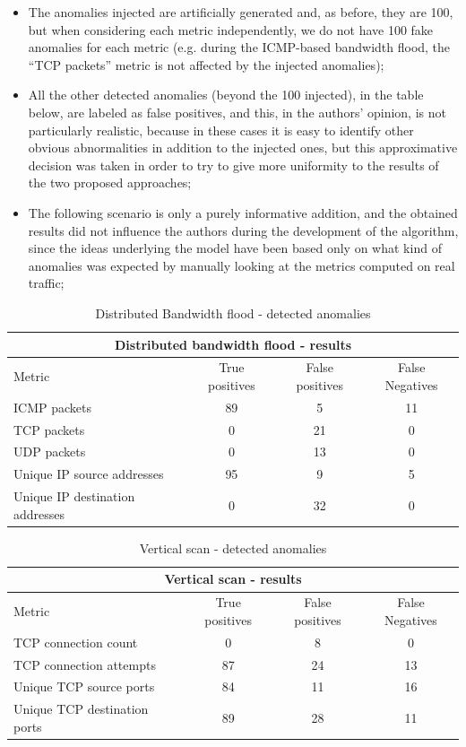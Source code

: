 \documentclass[12pt,a4paper,cucitura]{toptesi}
\begin{document}
\begin{itemize}
\item The anomalies injected are artificially generated and, as before, they are 100, but when considering each metric independently, we do not have 100 fake anomalies for each metric (e.g. during the ICMP-based bandwidth flood, the ``TCP packets'' metric is not affected by the injected anomalies);
\item All the other detected anomalies (beyond the 100 injected), in the table below, are labeled as false positives, and this, in the authors' opinion, is not particularly realistic, because in these cases it is easy to identify other obvious abnormalities in addition to the injected ones, but this approximative decision was taken in order to try to give more uniformity to the results of the two proposed approaches;
\item The following scenario is only a purely informative addition, and the obtained results did not influence the authors during the development of the algorithm, since the ideas underlying the model have been based only on what kind of anomalies was expected by manually looking at the metrics computed on real traffic;
\end{itemize}

\begin{center}
\begin{table}
\begin{tabular}{l|c|c|c}
\hline
\hline
\multicolumn{4}{c}{Distributed bandwidth flood - results} \\
\hline
Metric & True positives & False positives & False Negatives \\
\hline
ICMP packets & 89 & 5 & 11 \\
TCP packets & 0 & 21 & 0 \\
UDP packets & 0 & 13 & 0 \\
Unique IP source addresses & 95 & 9 & 5 \\
Unique IP destination addresses & 0 & 32 & 0 \\
\hline
\hline
\end{tabular}
\caption{Distributed Bandwidth flood - detected anomalies}
\end{table}
\end{center}

\begin{center}
\begin{table}
\begin{tabular}{l|c|c|c}
\hline
\hline
\multicolumn{4}{c}{Vertical scan - results} \\
\hline
Metric & True positives & False positives & False Negatives \\
\hline
TCP connection count & 0 & 8 & 0 \\
TCP connection attempts & 87 & 24 & 13 \\
Unique TCP source ports & 84 & 11 & 16 \\
Unique TCP destination ports & 89 & 28 & 11 \\
\hline
\hline
\end{tabular}
\caption{Vertical scan - detected anomalies}
\end{table}
\end{center}
\end{document}
